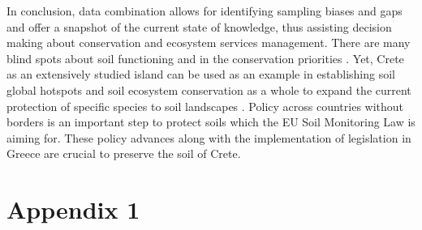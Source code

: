 \documentclass[a4paper,12pt]{article}
\begin{document}
In conclusion, data combination allows for identifying sampling biases and gaps and
offer a snapshot of the current state of knowledge, thus
assisting decision making about conservation and ecosystem services management.
There are many blind spots about soil functioning and in the conservation
priorities \parencite{farfan2024preliminary}. 
Yet, Crete as an extensively studied island can be used as an example in establishing
soil global hotspots \parencite{Guerra2022} and soil ecosystem conservation as 
a whole to expand the current protection of specific species to soil landscapes \parencite{guerra2021tracking}.
Policy \parencite{KONINGER2022} across countries \parencite{Putten2023}
without borders is an important step to protect soils which 
the EU Soil Monitoring Law is aiming for.
These policy advances along with the implementation of legislation in Greece \parencite{SCHISMENOS2022100035}
are crucial to preserve the soil of Crete.

\section{Appendix 1}\label{appendix1}
\end{document}
